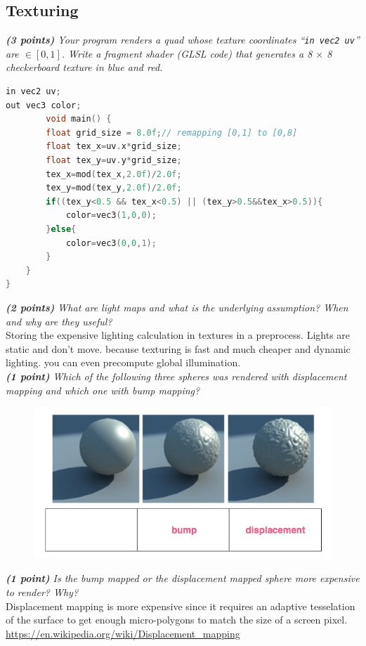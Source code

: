 \documentclass[a4paper,10pt]{article}
\begin{document}
\subsection{Texturing}
\textit{\textbf{(3 points)} Your program renders a quad whose texture coordinates ``\lstinline|in vec2 uv|'' are $\in [0, 1]$. Write a fragment shader (GLSL code) that generates a 8 $\times$ 8 checkerboard texture in blue and red.}\\
\begin{lstlisting}[language=C]
in vec2 uv;
out vec3 color;
		void main() {
		float grid_size = 8.0f;// remapping [0,1] to [0,8]
		float tex_x=uv.x*grid_size;
		float tex_y=uv.y*grid_size;
		tex_x=mod(tex_x,2.0f)/2.0f;
		tex_y=mod(tex_y,2.0f)/2.0f;
		if((tex_y<0.5 && tex_x<0.5) || (tex_y>0.5&&tex_x>0.5)){
			color=vec3(1,0,0);
		}else{
			color=vec3(0,0,1);
		}
	}
}
\end{lstlisting}

\textit{\textbf{(2 points)} What are light maps and what is the underlying assumption? When and why are they useful?}\\

Storing the expensive lighting calculation in textures in a preprocess. Lights are static and don’t move. because texturing is fast and much cheaper and dynamic lighting. you can even precompute global illumination.\\

\textit{\textbf{(1 point)} Which of the following three spheres was rendered with displacement
mapping and which one with bump mapping?}
\begin{figure}[H]
	\centering
	\includegraphics[width=.5\textwidth]{3-2-bump}
\end{figure}
\textit{\textbf{(1 point)} Is the bump mapped or the displacement mapped sphere more expensive to render? Why?}\\

Displacement mapping is more expensive since it requires an adaptive tesselation
of the surface to get enough micro-polygons to match the size of a screen pixel.\\

\url{https://en.wikipedia.org/wiki/Displacement_mapping}\\
\end{document}
